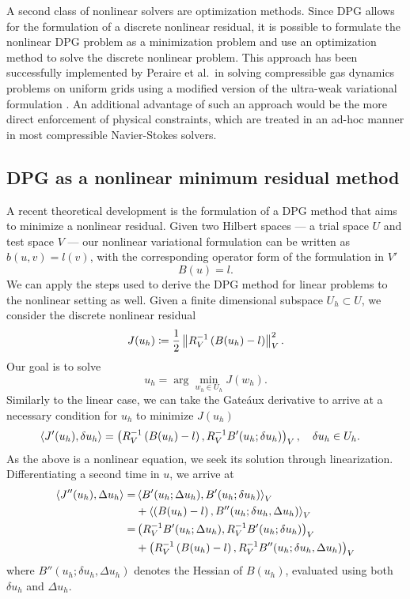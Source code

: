 A second class of nonlinear solvers are optimization methods.  Since DPG allows for the formulation of a discrete nonlinear residual, it is possible to formulate the nonlinear DPG problem as a minimization problem and use an optimization method to solve the discrete nonlinear problem.  This approach has been successfully implemented by Peraire et al.\ in solving compressible gas dynamics problems on uniform grids using a modified version of the ultra-weak variational formulation \cite{MITDPG}.  An additional advantage of such an approach would be the more direct enforcement of physical constraints, which are treated in an ad-hoc manner in most compressible Navier-Stokes solvers.  

\subsection{DPG as a nonlinear minimum residual method}

A recent theoretical development is the formulation of a DPG method that aims to minimize a nonlinear residual. Given two Hilbert spaces --- a trial space $U$ and test space $V$ --- our nonlinear variational formulation can be written as $b(u,v) = l(v)$, with the corresponding operator form of the formulation in $V'$
\[
B(u) = l.
\]
We can apply the steps used to derive the DPG method for linear problems to the nonlinear setting as well. Given a finite dimensional subspace $U_h \subset U$, we consider the discrete nonlinear residual
\[
J(u_h) \coloneqq \frac{1}{2}\nor{R_V^{-1}\left(B(u_h)-l\right)}_V^2.
\]
Our goal is to solve
\[
u_h = \arg \min_{w_h\in U_h}J(w_h).
\]
Similarly to the linear case, we can take the Gate\'aux derivative to arrive at a necessary condition for $u_h$ to minimize $J(u_h)$ 
\begin{align*}
\LRa{J'(u_h), \delta u_h} &= \LRp{R_V^{-1}\left(B(u_h)-l\right),R_V^{-1}B'(u_h;\delta u_h)}_V, \quad \delta u_h \in U_h. 
\end{align*}
As the above is a nonlinear equation, we seek its solution through linearization. Differentiating a second time in $u$, we arrive at
\begin{align*}
\LRa{J''(u_h), \Delta u_h} =& \LRa{B'(u_h;\Delta u_h), B'(u_h;\delta u_h)}_V \\
& + \LRa{\left(B(u_h)-l\right),B''(u_h;\delta u_h,\Delta u_h)}_V \\
=& \LRp{R_V^{-1}B'(u_h;\Delta u_h), R_V^{-1}B'(u_h;\delta u_h)}_V \\
& + \LRp{R_V^{-1}\left(B(u_h)-l\right),R_V^{-1}B''(u_h;\delta u_h,\Delta u_h)}_V 
\end{align*}
where $B''(u_h;\delta u_h,\Delta u_h)$ denotes the Hessian of $B(u_h)$, evaluated using both $\delta u_h$ and $\Delta u_h$. 

